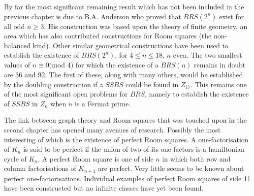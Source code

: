 \documentclass[
  11pt,
  a4paper]{book}
\begin{document}
By far the most significant remaining result which has not been included
in the previous chapter is due to B.A. Anderson who proved that
\(BRS(2^n)\) exist for all odd \(n \geq 3\). His construction was based upon
the theory of finite geometry, an area which has also contributed
constructions for Room squares (the non-balanced kind). Other similar
geometrical constructions have been used to establish the existence of
\(BRS(2^n)\), for \(4 \leq n \leq 18\), \(n\) even. The two smallest values of
\(n \equiv 0(\)mod 4) for which the existence of a \(BRS(n)\) remains in
doubt are 36 and 92. The first of these, along with many others, would
be established by the doubling construction if a \(SSBS\) could be found
in \(Z_{17}\). This remains one of the most significant open problems for
\(BRS\), namely to establish the existence of \(SSBS\) in \(Z_n\) when \(n\) is
a Fermat prime.

The link between graph theory and Room squares that was touched upon in
the second chapter has opened many avenues of research. Possibly the
most interesting of which is the existence of perfect Room squares. A
one-factorisation of \(K_n\) is said to be perfect if the union of two of
its one-factors is a hamiltonian cycle of \(K_n\). A perfect Room square
is one of side \(n\) in which both row and column factorisations of
\(K_{n+1}\) are perfect. Very little seems to be known about perfect
one-factorisations. Individual examples of perfect Room squares of side
11 have been constructed but no infinite classes have yet been found.

\printbibliography[title=References]
\end{document}

